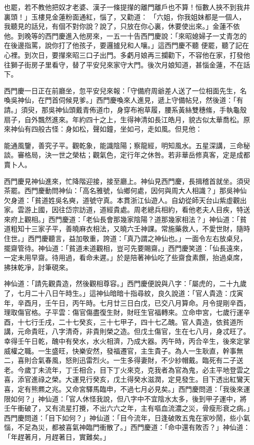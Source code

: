 \begin{showcontents}{}
也罷，若不教他把奴才老婆、漢子一條提攆的離門離戶也不算！恒數人挾不到我井裏頭！」玉樓見金蓮粉面通紅，惱了，又勸道：
「六姐，你我姐妹都是一個人，我聽見的話兒，有個不對你說？說了，只放在你心裏，休要使出來。」金蓮不依他。到晚等的西門慶進入他房來，一五一十告西門慶說：「來昭媳婦子一丈青怎的在後邊指罵，說你打了他孩子，要邏摣兒和人嚷。」這西門慶不聽
便罷，聽了記在心裡。到次日，要攆來昭三口子出門。多虧月娘再三攔勸下，不容他在家，打發他往獅子街房子里看守，替了平安兒來家守大門。後次月娘知道，甚惱金蓮，不在話下。


西門慶一日正在前廳坐，忽平安兒來報：「守備府周爺差人送了一位相面先生，名喚吳神仙，在門首伺候見爹。」西門慶喚來人進見，遞上守備帖兒，然後道：「有請。」須臾，那吳神仙頭戴青佈道巾，身穿布袍草履，腰系黃絲雙穗絛，手執龜殼扇子，自外飄然進來。年約四十之上，生得神清如長江皓月，貌古似太華喬松。原來神仙有四般古怪：身如松，聲如鐘，坐如弓，走如風。但見他：

能通風鑒，善究子平。觀乾象，能識陰陽；察龍經，明知風水。五星深講，三命秘談。審格局，決一世之榮枯；觀氣色，定行年之休咎。若非華岳修真客，定是成都賣卜人。

西門慶見神仙進來，忙降階迎接，接至廳上。神仙見西門慶，長揖稽首就坐。須臾茶罷。西門慶動問神仙：「高名雅號，仙鄉何處，因何與周大人相識？」那吳神仙欠身道：「貧道姓吳名奭，道號守真。本貫浙江仙遊人。自幼從師天台山紫虛觀出家。雲游上國，因往岱宗訪道，道經貴處。周老總兵相約，看他老夫人目疾，特送來府上觀相。」西門慶道：「老仙長會那幾家陰陽？道那幾家相法？」神仙道：「貧道粗知十三家子平，善曉麻衣相法，又曉六壬神課。常施藥救人，不愛世財，隨時住世。」西門慶聽言，益加敬重，誇道：「真乃謂之神仙也。」一面令左右放桌兒，擺齋管待。神仙道：「貧道未道觀相，豈可先要賜齋。」西門慶笑道：「仙長遠來，一定未用早齋。待用過，看命未遲。」於是陪著神仙吃了些齋食素饌，抬過桌席，拂抹乾凈，討筆硯來。

神仙道：「請先觀貴造，然後觀相尊容。」西門慶便說與八字：「屬虎的，二十九歲了，七月二十八日午時生。」這神仙暗暗十指尋紋，良久說道：「官人貴造：戊寅年，辛酉月，壬午日，丙午時。七月廿三日白戊，已交八月算命。月令提剛辛酉，理取傷官格。子平雲：傷官傷盡復生財，財旺生官福轉來。立命申宮，七歲行運辛酉，十七行壬戌，二十七癸亥，三十七甲子，四十七乙醜。官人貴造，依貧道所講，元命貴旺，八字清奇，非貴則榮之造。但戊土傷官，生在七八月，身忒旺了。幸得壬午日乾，醜中有癸水，水火相濟，乃成大器。丙午時，丙合辛生，後來定掌威權之職。一生盛旺，快樂安然，發福遷官，主生貴子。為人一生耿直，幹事無二，喜則合氣春風，怒則迅雷烈火。一生多得妻財，不少紗帽戴。臨死有二子送老。今歲丁未流年，丁壬相合，目下丁火來克，克我者為官為鬼，必主平地登雲之喜，添官進祿之榮。大運見行癸亥，戊土得癸水滋潤，定見發生。目下透出紅鸞天喜，定有熊羆之兆。又命宮驛馬臨申，不過七月必見矣。」西門慶問道：「我後來運限如何？」神仙道：「官人休怪我說，但八字中不宜陰水太多，後到甲子運中，將壬午衝破了，又有流星打攪，不出六六之年，主有嘔血流濃之災，骨瘦形衰之病。」西門慶問道：「目下如何？」神仙道：「目今流年，日逢破敗五鬼在家吵鬧，些小氣惱，不足為災，都被喜氣神臨門衝散了。」西門慶道：「命中還有敗否？」神仙道：「年趕著月，月趕著日，實難矣。」


\end{showcontents}
